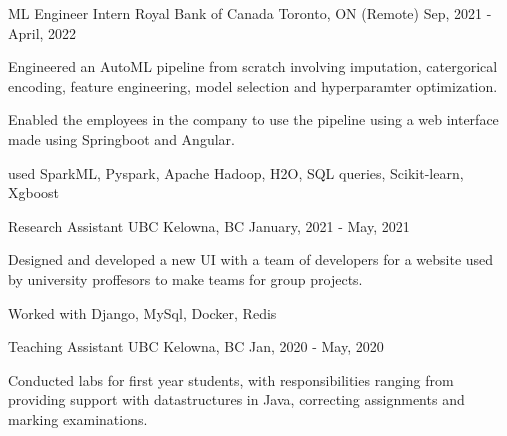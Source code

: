 

\begin{cventries}

  \cventry
    {ML Engineer Intern} %
    {Royal Bank of Canada} %
    {Toronto, ON (Remote)} %
    {Sep, 2021 - April, 2022} %
    {
      \begin{cvitems} %
        \item {Engineered an AutoML pipeline from scratch involving imputation, catergorical encoding, feature engineering, model selection and hyperparamter optimization.} 
        \item {Enabled the employees in the company to use the pipeline using a web interface made using Springboot and Angular.}
        \item {used SparkML, Pyspark, Apache Hadoop, H2O, SQL queries, Scikit-learn, Xgboost}
      \end{cvitems}
    }

  \cventry
    {Research Assistant} %
    {UBC} %
    {Kelowna, BC} %
    {January, 2021 - May, 2021} %
    {
      \begin{cvitems} %
        \item {Designed and developed a new UI with a team of developers for a website used by university proffesors to make teams for group projects.} 
        \item {Worked with Django, MySql, Docker, Redis}
      \end{cvitems}
    }

  \cventry
    {Teaching Assistant} %
    {UBC} %
    {Kelowna, BC} %
    {Jan, 2020 - May, 2020} %
    {
      \begin{cvitems} %
        \item {Conducted labs for first year students, with responsibilities ranging from providing support with datastructures in Java, correcting assignments and marking examinations.}
      \end{cvitems}
    }


\end{cventries}
